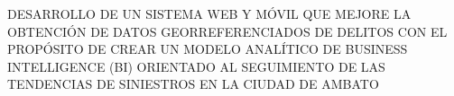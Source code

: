 \begin{nohyphens}
	\uppercase{ Desarrollo de un sistema web y móvil que mejore la obtención de
		datos georreferenciados de delitos con el propósito de crear un modelo
		analítico de Business Intelligence (BI) orientado al
		seguimiento de las tendencias de siniestros en la ciudad de Ambato}
\end{nohyphens}